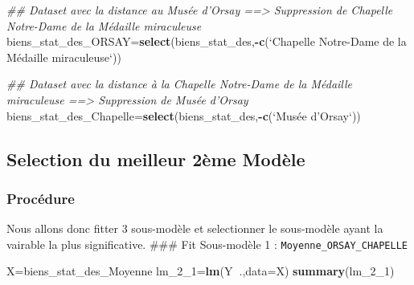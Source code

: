\documentclass[french,]{article}
\newenvironment{Shaded}{\begin{snugshade}}{\end{snugshade}}
\newcommand{\CommentTok}[1]{\textcolor[rgb]{0.56,0.35,0.01}{\textit{#1}}}
\newcommand{\DataTypeTok}[1]{\textcolor[rgb]{0.13,0.29,0.53}{#1}}
\newcommand{\DecValTok}[1]{\textcolor[rgb]{0.00,0.00,0.81}{#1}}
\newcommand{\KeywordTok}[1]{\textcolor[rgb]{0.13,0.29,0.53}{\textbf{#1}}}
\newcommand{\NormalTok}[1]{#1}
\newcommand{\OperatorTok}[1]{\textcolor[rgb]{0.81,0.36,0.00}{\textbf{#1}}}
\newcommand{\StringTok}[1]{\textcolor[rgb]{0.31,0.60,0.02}{#1}}
\begin{document}
\begin{Shaded}
\begin{Highlighting}[]
\CommentTok{## Dataset avec la distance au Musée d'Orsay ==> Suppression de Chapelle Notre-Dame de la Médaille miraculeuse}
\NormalTok{biens_stat_des_ORSAY=}\KeywordTok{select}\NormalTok{(biens_stat_des,}\OperatorTok{-}\KeywordTok{c}\NormalTok{(}\StringTok{`}\DataTypeTok{Chapelle Notre-Dame de la Médaille miraculeuse}\StringTok{`}\NormalTok{))}

\CommentTok{## Dataset avec la distance à la Chapelle Notre-Dame de la Médaille miraculeuse ==> Suppression de Musée d'Orsay }
\NormalTok{biens_stat_des_Chapelle=}\KeywordTok{select}\NormalTok{(biens_stat_des,}\OperatorTok{-}\KeywordTok{c}\NormalTok{(}\StringTok{`}\DataTypeTok{Musée d’Orsay}\StringTok{`}\NormalTok{))}
\end{Highlighting}
\end{Shaded}

\hypertarget{selection-du-meilleur-2uxe8me-moduxe8le}{%
\subsection{Selection du meilleur 2ème
Modèle}\label{selection-du-meilleur-2uxe8me-moduxe8le}}

\hypertarget{procuxe9dure}{%
\subsubsection{Procédure}\label{procuxe9dure}}

Nous allons donc fitter 3 sous-modèle et selectionner le sous-modèle
ayant la vairable la plus significative. \#\#\# Fit Sous-modèle 1 :
\texttt{Moyenne\_ORSAY\_CHAPELLE}

\begin{Shaded}
\begin{Highlighting}[]
\NormalTok{X=biens_stat_des_Moyenne}
\NormalTok{lm_}\DecValTok{2}\NormalTok{_}\DecValTok{1}\NormalTok{=}\KeywordTok{lm}\NormalTok{(Y}\OperatorTok{~}\NormalTok{.,}\DataTypeTok{data=}\NormalTok{X)  }
\KeywordTok{summary}\NormalTok{(lm_}\DecValTok{2}\NormalTok{_}\DecValTok{1}\NormalTok{)}
\end{Highlighting}
\end{Shaded}
\end{document}
